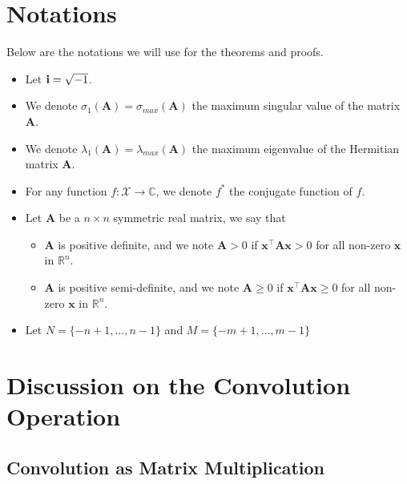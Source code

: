 \section{Notations}
Below are the notations we will use for the theorems and proofs. 
\begin{itemize}
\itemsep0em 
    \item Let $\mathbf{i} = \sqrt{-1}$.
    \item We denote $\sigma_1(\mathbf{A}) = \sigma_{max}(\mathbf{A})$ the maximum singular value of the matrix $\mathbf{A}$. 
    \item We denote $\lambda_1(\mathbf{A}) = \lambda_{max}(\mathbf{A})$ the maximum eigenvalue of the Hermitian matrix $\mathbf{A}$. 
    \item For any function $f: \mathcal{X} \rightarrow \mathbb{C}$, we denote $f^*$ the conjugate function of $f$.
    \item Let $\mathbf{A}$ be a $n \times n$ symmetric real matrix, we say that 
    \begin{itemize}
        \item[] $\mathbf{A}$ is positive definite, and we note $\mathbf{A} > 0$ if $\mathbf{x}^{\top} \mathbf{A} \mathbf{x} > 0$ for all non-zero $\mathbf{x}$ in $\mathbb{R}^{n}$.
        \item[] $\mathbf{A}$ is positive semi-definite, and we note $\mathbf{A} \geq 0$ if $\mathbf{x}^{\top} \mathbf{A} \mathbf{x} \geq 0$ for all non-zero $\mathbf{x}$ in $\mathbb{R}^{n}$.
    \end{itemize}
    \item Let $N = \{ -n+1, \dots, n-1 \}$ and $M = \{ -m+1, \dots, m-1 \}$
\end{itemize}


\section{Discussion on the Convolution Operation}

\subsection{Convolution as Matrix Multiplication}\label{appendix-sec:conv_matrix_multiplication}

